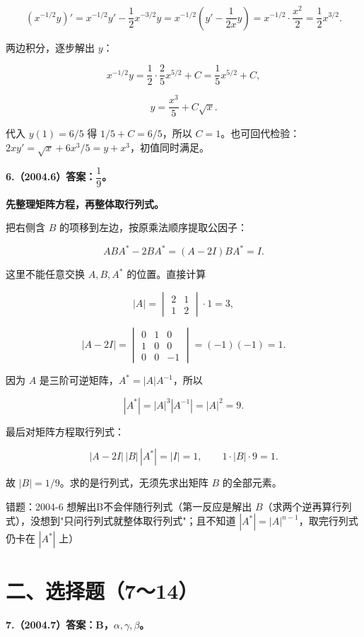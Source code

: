 \documentclass[UTF8,11pt,fontset=windows]{ctexart}
\begin{document}
$$
\left(x^{-1/2}y\right)'
=x^{-1/2}y'-\frac12x^{-3/2}y
=x^{-1/2}\left(y'-\frac{1}{2x}y\right)
=x^{-1/2}\cdot\frac{x^2}{2}
=\frac12x^{3/2}.
$$

两边积分，逐步解出 $y$：

$$
x^{-1/2}y=\frac12\cdot\frac25x^{5/2}+C
=\frac15x^{5/2}+C,
$$

$$
y=\frac{x^3}{5}+C\sqrt x.
$$

代入 $y(1)=6/5$ 得 $1/5+C=6/5$，所以 $C=1$。也可回代检验：$2xy'=\sqrt x+6x^3/5=y+x^3$，初值同时满足。

\clearpage

\textbf{6.（2004.6）答案：$\dfrac19$。}

\textbf{先整理矩阵方程，再整体取行列式。}

把右侧含 $B$ 的项移到左边，按原乘法顺序提取公因子：

$$
ABA^*-2BA^*=(A-2I)BA^*=I.
$$

这里不能任意交换 $A,B,A^*$ 的位置。直接计算

$$
|A|=\begin{vmatrix}2&1\\1&2\end{vmatrix}\cdot1=3,
$$

$$
|A-2I|=\begin{vmatrix}0&1&0\\1&0&0\\0&0&-1\end{vmatrix}=(-1)(-1)=1.
$$

因为 $A$ 是三阶可逆矩阵，$A^*=|A|A^{-1}$，所以

$$
|A^*|=|A|^3|A^{-1}|=|A|^2=9.
$$

最后对矩阵方程取行列式：

$$
|A-2I|\,|B|\,|A^*|=|I|=1,
\qquad 1\cdot|B|\cdot9=1.
$$

故 $\boxed{|B|=1/9}$。求的是行列式，无须先求出矩阵 $B$ 的全部元素。

\begingroup\color{gray}错题：2004-6 想解出B不会伴随行列式（第一反应是解出 $B$（求两个逆再算行列式），没想到"只问行列式就整体取行列式"；且不知道 $|A^{*}|=|A|^{n-1}$，取完行列式仍卡在 $|A^{*}|$ 上）\par\endgroup

\clearpage

\section*{二、选择题（7～14）}

\textbf{7.（2004.7）答案：B，$\alpha,\gamma,\beta$。}
\end{document}
